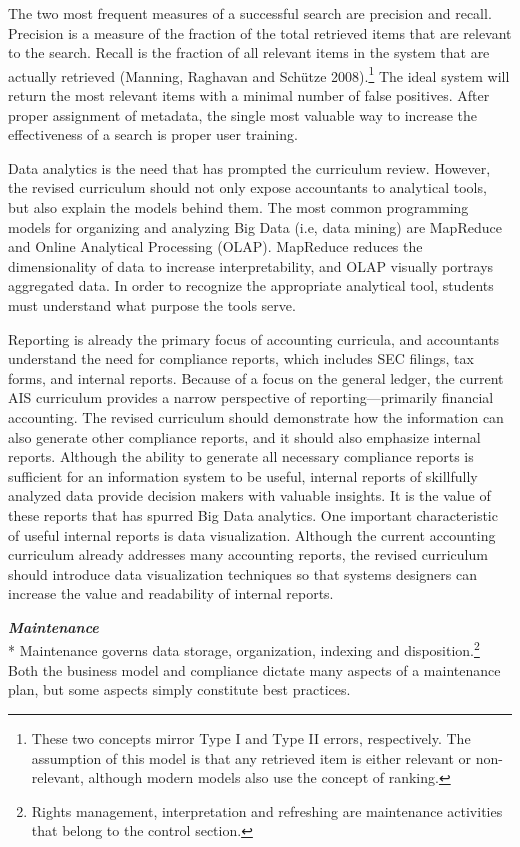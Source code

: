 \documentclass[12pt]{article}
\newcommand{\SubSubSection}[1]{{\centering{}\normalsize{}\textbf{\emph{#1}}}\\*\indent{}}
\begin{document}
The two most frequent measures of a successful search are precision and recall. Precision is a measure of the fraction of the total retrieved items that are relevant to the search. Recall is the fraction of all relevant items in the system that are actually retrieved (Manning, Raghavan and Sch\"utze 2008).\footnote{These two concepts mirror Type I and Type II errors, respectively. The assumption of this model is that any retrieved item is either relevant or non-relevant, although modern models also use the concept of ranking.} The ideal system will return the most relevant items with a minimal number of false positives. After proper assignment of metadata, the single most valuable way to increase the effectiveness of a search is proper user training.

Data analytics is the need that has prompted the curriculum review. However, the revised curriculum should not only expose accountants to analytical tools, but also explain the models behind them. The most common programming models for organizing and analyzing Big Data (i.e, data mining) are MapReduce and Online Analytical Processing (OLAP). MapReduce reduces the dimensionality of data to increase interpretability, and OLAP visually portrays aggregated data. In order to recognize the appropriate analytical tool, students must understand what purpose the tools serve.

Reporting is already the primary focus of accounting curricula, and accountants understand the need for compliance reports, which includes SEC filings, tax forms, and internal reports. Because of a focus on the general ledger, the current AIS curriculum provides a narrow perspective of reporting---primarily financial accounting.  The revised curriculum should demonstrate how the information can also generate other compliance reports, and it should also emphasize internal reports. Although the ability to generate all necessary compliance reports is sufficient for an information system to be useful, internal reports of skillfully analyzed data provide decision makers with valuable insights. It is the value of these reports that has spurred Big Data analytics. One important characteristic of useful internal reports is data visualization. Although the current accounting curriculum already addresses many accounting reports, the revised curriculum should introduce data visualization techniques so that systems designers can increase the value and readability of internal reports.

\SubSubSection{Maintenance}
Maintenance governs data storage, organization, indexing and disposition.\footnote{Rights management, interpretation and refreshing are maintenance activities that belong to the control section.} Both the business model and compliance dictate many aspects of a maintenance plan, but some aspects simply constitute best practices.
\end{document}
